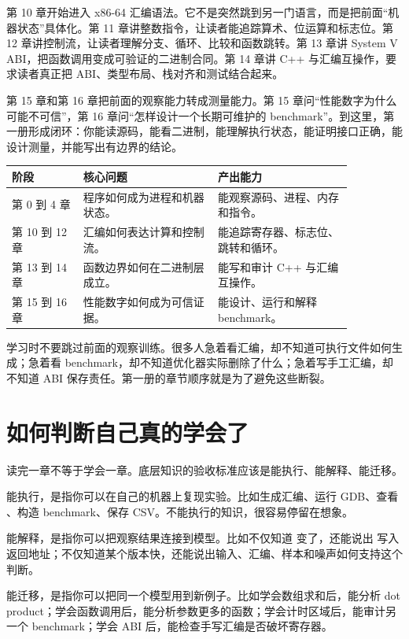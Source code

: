 第 10 章开始进入 x86-64 汇编语法。它不是突然跳到另一门语言，而是把前面“机器状态”具体化。第 11 章讲整数指令，让读者能追踪算术、位运算和标志位。第 12 章讲控制流，让读者理解分支、循环、比较和函数跳转。第 13 章讲 System V ABI，把函数调用变成可验证的二进制合同。第 14 章讲 C++ 与汇编互操作，要求读者真正把 ABI、类型布局、栈对齐和测试结合起来。

第 15 章和第 16 章把前面的观察能力转成测量能力。第 15 章问“性能数字为什么可能不可信”，第 16 章问“怎样设计一个长期可维护的 benchmark”。到这里，第一册形成闭环：你能读源码，能看二进制，能理解执行状态，能证明接口正确，能设计测量，并能写出有边界的结论。

\begin{center}
\begin{tabular}{p{0.18\linewidth}p{0.34\linewidth}p{0.34\linewidth}}
\toprule
阶段 & 核心问题 & 产出能力 \\
\midrule
第 0 到 4 章 & 程序如何成为进程和机器状态。 & 能观察源码、进程、内存和指令。 \\
第 10 到 12 章 & 汇编如何表达计算和控制流。 & 能追踪寄存器、标志位、跳转和循环。 \\
第 13 到 14 章 & 函数边界如何在二进制层成立。 & 能写和审计 C++ 与汇编互操作。 \\
第 15 到 16 章 & 性能数字如何成为可信证据。 & 能设计、运行和解释 benchmark。 \\
\bottomrule
\end{tabular}
\end{center}

学习时不要跳过前面的观察训练。很多人急着看汇编，却不知道可执行文件如何生成；急着看 benchmark，却不知道优化器实际删除了什么；急着写手工汇编，却不知道 ABI 保存责任。第一册的章节顺序就是为了避免这些断裂。

\section{如何判断自己真的学会了}

读完一章不等于学会一章。底层知识的验收标准应该是能执行、能解释、能迁移。

能执行，是指你可以在自己的机器上复现实验。比如生成汇编、运行 GDB、查看 、构造 benchmark、保存 CSV。不能执行的知识，很容易停留在想象。

能解释，是指你可以把观察结果连接到模型。比如不仅知道  变了，还能说出  写入返回地址；不仅知道某个版本快，还能说出输入、汇编、样本和噪声如何支持这个判断。

能迁移，是指你可以把同一个模型用到新例子。比如学会数组求和后，能分析 dot product；学会函数调用后，能分析参数更多的函数；学会计时区域后，能审计另一个 benchmark；学会 ABI 后，能检查手写汇编是否破坏寄存器。

